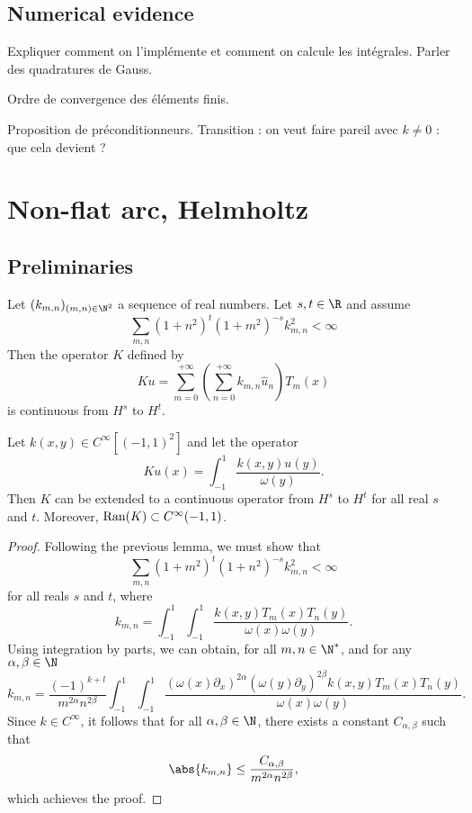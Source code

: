 \documentclass[]{article}
\begin{document}
\subsection{Numerical evidence}
Expliquer comment on l'implémente et comment on calcule les intégrales. Parler des quadratures de Gauss. 

\begin{Prop}
	Ordre de convergence des éléments finis.
\end{Prop}
Proposition de préconditionneurs. 
Transition : on veut faire pareil avec $k \neq 0$ : que cela devient ? 

\section{Non-flat arc, Helmholtz}


\subsection{Preliminaries}


\begin{Lem}
	Let $(k_{m,n})_{(m,n)\in \N^2}$ a sequence of real numbers. Let $s, t \in \R$ and assume
	\[ \sum_{m,n} (1 + n^2)^{t} (1 + m^2)^{-s} k_{m,n}^2 < \infty\]
	Then the operator $K$ defined by 
	\[Ku = \sum_{m=0}^{+\infty} \left(\sum_{n=0}^{+\infty} k_{m,n} \hat{u}_n\right) T_m(x)\]
	is continuous from $H^s$ to $H^t$. 
\end{Lem}

\begin{Lem}
	Let $k(x,y) \in C^{\infty}[(-1,1)^2]$ and let the operator 
	\[Ku(x) = \int_{-1}^{1} \dfrac{k(x,y) u(y)}{\omega(y)}.\]
	Then $K$ can be extended to a continuous operator from $H^s$ to $H^t$ for all real $s$ and $t$. Moreover, $\textup{Ran}(K) \subset C^{\infty}(-1,1)$.
	\begin{proof}
		Following the previous lemma, we must show that 
		\[\sum_{m,n} (1+m^2)^t(1+n^2)^{-s}k_{m,n}^2 <\infty\]
		for all reals $s$ and $t$, where 
		\[k_{m,n} = \int_{-1}^{1}\int_{-1}^{1} \dfrac{k(x,y) T_m(x) T_n(y)}{\omega(x) \omega(y)}.\]
		Using integration by parts, we can obtain, for all $m,n \in \N^*$, and for any $\alpha, \beta \in \N$
		\[k_{m,n} = \dfrac{(-1)^{k+l}}{m^{2\alpha}n^{2\beta}}\int_{-1}^{1} \int_{-1}^{1} \dfrac{(\omega(x) \partial_x)^{2\alpha}(\omega(y) \partial_y)^{2\beta}k(x,y)T_m(x)T_n(y)}{\omega(x) \omega(y)}.\]
		Since $k \in C^{\infty}$, it follows that for all $\alpha, \beta \in \N$, there exists a constant $C_{\alpha,\beta}$ such that
		\[\abs{k_{m,n}} \leq \dfrac{C_{\alpha,\beta}}{m^{2\alpha}n^{2\beta}},\]
		which achieves the proof. 
	\end{proof}
\end{Lem}
\end{document}
